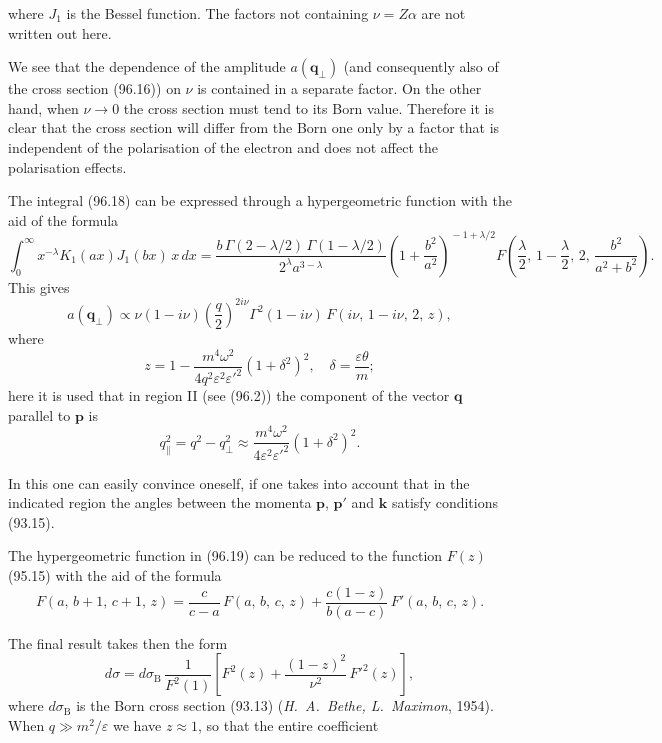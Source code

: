 where $J_1$ is the Bessel function. The factors not containing $\nu = Z\alpha$ are not written out here.

We see that the dependence of the amplitude $a(\mathbf{q}_\perp)$ (and consequently also of the cross section (96.16)) on $\nu$ is contained in a separate factor. On the other hand, when $\nu \to 0$ the cross section must tend to its Born value. Therefore it is clear that the cross section will differ from the Born one only by a factor that is independent of the polarisation of the electron and does not affect the polarisation effects.

The integral (96.18) can be expressed through a hypergeometric function with the aid of the formula
\[
\int_0^{\infty}x^{-\lambda}K_1(ax)J_1(bx)\,x\,dx = \frac{b\,\Gamma(2-\lambda/2)\,\Gamma(1-\lambda/2)}{2^\lambda a^{3-\lambda}}\!\left(1+\frac{b^2}{a^2}\right)^{\!-1+\lambda/2}\!F\!\left(\frac{\lambda}{2},\,1-\frac{\lambda}{2},\,2,\,\frac{b^2}{a^2+b^2}\right).
\]
This gives
\begin{equation}
a(\mathbf{q}_\perp) \propto \nu(1-i\nu)\!\left(\frac{q}{2}\right)^{\!2i\nu}\!\Gamma^2(1-i\nu)\,F(i\nu,\,1-i\nu,\,2,\,z),
\label{eq:96.19}
\end{equation}
where
\begin{equation}
z = 1 - \frac{m^4\omega^2}{4q^2\varepsilon^2\varepsilon'^2}(1+\delta^2)^2, \quad \delta = \frac{\varepsilon\theta}{m};
\label{eq:96.20}
\end{equation}
here it is used that in region II (see (96.2)) the component of the vector $\mathbf{q}$ parallel to $\mathbf{p}$ is
\begin{equation}
q_\parallel^2 = q^2 - q_\perp^2 \approx \frac{m^4\omega^2}{4\varepsilon^2\varepsilon'^2}(1+\delta^2)^2.
\label{eq:96.21}
\end{equation}

In this one can easily convince oneself, if one takes into account that in the indicated region the angles between the momenta $\mathbf{p}$, $\mathbf{p}'$ and $\mathbf{k}$ satisfy conditions (93.15).

The hypergeometric function in (96.19) can be reduced to the function $F(z)$ (95.15) with the aid of the formula
\[
F(a,\,b+1,\,c+1,\,z) = \frac{c}{c-a}\,F(a,\,b,\,c,\,z) + \frac{c(1-z)}{b(a-c)}\,F'(a,\,b,\,c,\,z).
\]

The final result takes then the form
\begin{equation}
d\sigma = d\sigma_\text{B}\,\frac{1}{F^2(1)}\!\left[F^2(z) + \frac{(1-z)^2}{\nu^2}\,F'^2(z)\right],
\label{eq:96.22}
\end{equation}
where $d\sigma_\text{B}$ is the Born cross section (93.13) (\emph{H.~A.~Bethe, L.~Maximon}, 1954). When $q \gg m^2/\varepsilon$ we have $z \approx 1$, so that the entire coefficient

